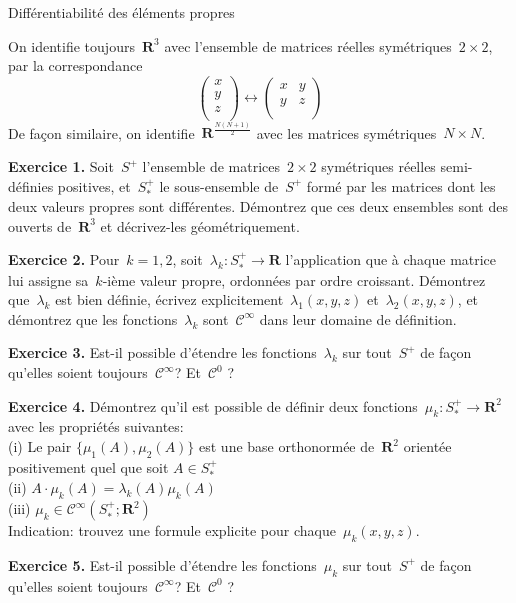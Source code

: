 \documentclass[a4paper,11pt]{article}
\def\R{\mathbf{R}}
\begin{document}
\thispagestyle{empty}

\begin{center}
	\Large Différentiabilité des éléments propres
\end{center}

On identifie toujours~$\R^3$ avec l'ensemble de matrices réelles symétriques~$2\times
2$, par la correspondance
\[
	\begin{pmatrix}
		x\\
		y\\
		z\\
	\end{pmatrix}
	\longleftrightarrow
	\begin{pmatrix}
		x & y \\
		y & z \\
	\end{pmatrix}
\]
De façon similaire, on identifie~$\R^{\frac{N(N+1)}{2}}$
avec les matrices symétriques~$N\times N$.

{\bf Exercice 1.}
Soit~$S^+$ l'ensemble de matrices~$2\times 2$ symétriques réelles semi-définies
positives, et~$S^+_*$ le sous-ensemble de~$S^+$ formé par les matrices dont les
deux valeurs propres sont différentes.  Démontrez que ces deux ensembles sont
des ouverts de~$\R^3$ et décrivez-les géométriquement.

{\bf Exercice 2.}
Pour~$k=1,2$, soit~$\lambda_k:S^+_*\to\R$ l'application que à chaque matrice
lui assigne sa~$k$-ième valeur propre, ordonnées par ordre croissant.
Démontrez que~$\lambda_k$ est bien définie,
écrivez
explicitement~$\lambda_1(x,y,z)$ et~$\lambda_2(x,y,z)$, et démontrez que les
fonctions~$\lambda_k$ sont~$\mathcal{C}^\infty$ dans leur domaine de
définition.

{\bf Exercice 3.} Est-il possible d'étendre les fonctions~$\lambda_k$ sur
tout~$S^+$ de façon qu'elles soient toujours~$\mathcal{C}^\infty$?
Et~$\mathcal{C}^0$ ?

{\bf Exercice 4.}
Démontrez qu'il est possible de définir deux fonctions~$\mu_k:S^+_*\to\R^2$
avec les propriétés suivantes:\\
(i) Le pair
$\{\mu_1(A),\mu_2(A)\}$ est une base orthonormée
de~$\R^2$ orientée positivement quel que soit
$A\in S^+_*$\\
(ii) $A\cdot\mu_k(A)=\lambda_k(A)\mu_k(A)$\\
(iii) $\mu_k\in\mathcal{C}^\infty(S^+_*;\R^2)$\\
Indication: trouvez une formule explicite pour chaque~$\mu_k(x,y,z)$.


{\bf Exercice 5.}
Est-il possible d'étendre les fonctions~$\mu_k$ sur
tout~$S^+$ de façon qu'elles soient toujours~$\mathcal{C}^\infty$?
Et~$\mathcal{C}^0$ ?
\end{document}

